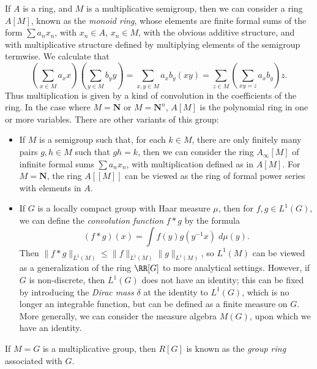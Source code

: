 \begin{example}
    If $A$ is a ring, and $M$ is a multiplicative semigroup, then we can consider a ring $A[M]$, known as the \emph{monoid ring}, whose elements are finite formal sums of the form $\sum a_n x_n$, with $x_n \in A$, $x_n \in M$, with the obvious additive structure, and with multiplicative structure defined by multiplying elements of the semigroup termwise. We calculate that
    \[ \left( \sum_{x \in M} a_x x \right) \left( \sum_{y \in M} b_y y \right) = \sum_{x,y \in M} a_x b_y (xy) = \sum_{z \in M} \left( \sum_{xy = z} a_x b_y \right) z. \]
    Thus multiplication is given by a kind of convolution in the coefficients of the ring. In the case where $M = \mathbf{N}$ or $M = \mathbf{N}^n$, $A[M]$ is the polynomial ring in one or more variables. There are other variants of this group:
    \begin{itemize}
        \item If $M$ is a semigroup such that, for each $k \in M$, there are only finitely many pairs $g,h \in M$ such that $gh = k$, then we can consider the ring $A_\infty[M]$ of infinite formal sums $\sum a_n x_n$, with multiplication defined as in $A[M]$. For $M = \mathbf{N}$, the ring $A[[M]]$ can be viewed as the ring of formal power series with elements in $A$.

        \item If $G$ is a locally compact group with Haar measure $\mu$, then for $f,g \in L^1(G)$, we can define the \emph{convolution function} $f * g$ by the formula
        \[ (f * g)(x) = \int f(y) g(y^{-1} x)\; d\mu(y). \]
        Then $\| f * g \|_{L^1(M)} \leq \| f \|_{L^1(M)} \| g \|_{L^1(M)}$, so $L^1(M)$ can be viewed as a generalization of the ring $\RR[G]$ to more analytical settings. However, if $G$ is non-discrete, then $L^1(G)$ does not have an identity; this can be fixed by introducing the \emph{Dirac mass} $\delta$ at the identity to $L^1(G)$, which is no longer an integrable function, but can be defined as a finite measure on $G$. More generally, we can consider the measure algebra $M(G)$, upon which we have an identity.
    \end{itemize}
    If $M = G$ is a multiplicative group, then $R[G]$ is known as the \emph{group ring} associated with $G$.
\end{example}

